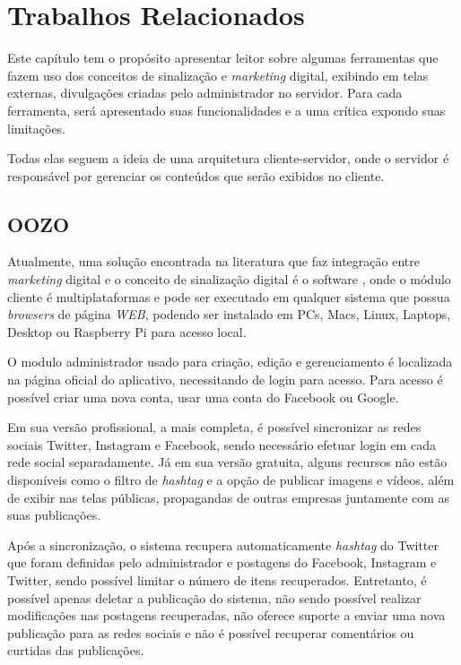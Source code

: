 \chapter[Trabalhos Relacionados]{Trabalhos Relacionados}
Este capítulo tem o propósito apresentar leitor sobre algumas ferramentas que fazem uso dos conceitos de sinalização e \textit{marketing} digital, exibindo em telas externas, divulgações criadas pelo administrador no servidor. Para cada ferramenta, será apresentado suas funcionalidades e a uma crítica expondo suas limitações.

Todas elas seguem a ideia de uma arquitetura cliente-servidor, onde o servidor é responsável por gerenciar os conteúdos que serão exibidos no cliente.

\section{OOZO}
\label{sec:oozo}
Atualmente, uma solução encontrada na literatura que faz integração entre \textit{marketing} digital e o conceito de sinalização digital é o software \cite{oozo2017}, onde o módulo cliente é multiplataformas e pode ser executado em qualquer sistema que possua \textit{browsers} de página \textit{WEB}, podendo ser instalado em PCs, Macs, Linux, Laptops, Desktop ou Raspberry Pi para acesso local.

O modulo administrador usado para criação, edição e gerenciamento é localizada na página oficial do aplicativo, necessitando de login para acesso. Para acesso é possível criar uma nova conta, usar uma conta do Facebook ou Google. 

Em sua versão profissional, a mais completa, é possível sincronizar as redes sociais Twitter, Instagram e Facebook, sendo necessário efetuar login em cada rede social separadamente. Já em sua versão gratuita, alguns recursos não estão disponíveis como o filtro de \textit{hashtag} e a opção de publicar imagens e vídeos, além de exibir nas telas públicas, propagandas de outras empresas juntamente com as suas publicações. 

Após a sincronização, o sistema recupera automaticamente \textit{hashtag} do Twitter que foram definidas pelo administrador e postagens do Facebook, Instagram e Twitter, sendo possível limitar o número de itens recuperados. Entretanto, é possível apenas deletar a publicação do sistema, não sendo possível realizar modificações nas postagens recuperadas, não oferece suporte a enviar uma nova publicação para as redes sociais e não é possível recuperar comentários ou curtidas das publicações.

